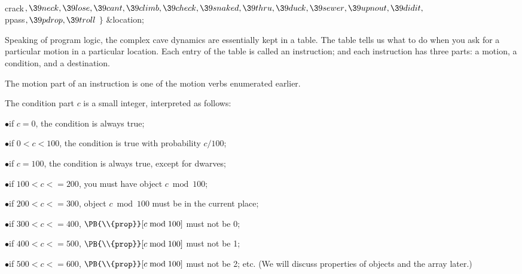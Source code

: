 \\{crack}${},\39\\{neck},\39\\{lose},\39\\{cant},\39\\{climb},\39\\{check},\39%
\\{snaked},\39\\{thru},\39\\{duck},\39\\{sewer},\39\\{upnout},\39\\{didit},{}$\6
\\{ppass}${},\39\\{pdrop},\39\\{troll}{}$\2\6
${}\}{}$ \&{location};\par
\fi

Speaking of program logic, the complex cave dynamics are
essentially
kept in a table. The table tells us what to do when you ask for a particular
motion in a particular location. Each entry of the table is called
an instruction; and each instruction has three parts: a motion,
a condition, and a destination.

The motion part of an instruction is one of the motion verbs enumerated
earlier.

The condition part $c$ is a small integer, interpreted as follows:
\xdef\instspecs{\secno}

\smallskip
\item{$\bullet$}if $c=0$, the condition is always true;
\item{$\bullet$}if $0<c<100$, the condition is true with probability $c/100$;
\item{$\bullet$}if $c=100$, the condition is always true, except for dwarves;
\item{$\bullet$}if $100<c<=200$, you must have object $c\bmod100$;
\item{$\bullet$}if $200<c<=300$, object $c\bmod100$ must be in the current
place;
\item{$\bullet$}if $300<c<=400$, $\PB{\\{prop}}[c\bmod100]$ must not be 0;
\item{$\bullet$}if $400<c<=500$, $\PB{\\{prop}}[c\bmod100]$ must not be 1;
\item{$\bullet$}if $500<c<=600$, $\PB{\\{prop}}[c\bmod100]$ must not be 2; etc.
\smallskip
\noindent (We will discuss properties of objects and the  array
later.)

